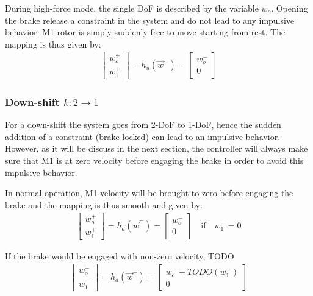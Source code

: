 During high-force mode, the single DoF is described by the variable $w_o$. Opening the brake release a constraint in the system and do not lead to any impulsive behavior. M1 rotor is simply suddenly free to move starting from rest. The mapping is thus given by:
\begin{align} 
\left[
\begin{array}{c}
w_o^+ \\ w_1^+
\end{array}
\right] = h_u( \vec{w}^- ) = 
\left[
\begin{array}{c}
w_o^- \\ 0
\end{array}
\right]
\label{eq:upshiftmap}
\end{align}



\subsubsection{Down-shift $k:2\rightarrow1$}

For a down-shift the system goes from 2-DoF to 1-DoF, hence the sudden addition of a constraint (brake locked) can lead to an impulsive behavior. However, as it will be discuss in the next section, the controller will always make sure that M1 is at zero velocity before engaging the brake in order to avoid this impulsive behavior. 


In normal operation, M1 velocity will be brought to zero before engaging the brake and the mapping is thus smooth and given by:
%
\begin{align} 
\left[
\begin{array}{c}
w_o^+ \\ w_1^+
\end{array}
\right]
 = h_d( \vec{w}^- ) = 
\left[
\begin{array}{c}
w_o^- \\ 0
\end{array}
\right] \quad \text{if} \quad w_1^-=0
\label{eq:downshiftmap_ideal}
\end{align}


%
If the brake would be engaged with non-zero velocity, TODO
\begin{align} 
\left[
\begin{array}{c}
w_o^+ \\ w_1^+
\end{array}
\right]
 = h_d( \vec{w}^- ) = 
\left[
\begin{array}{c}
w_o^- + TODO(w_1^-) \\ 0
\end{array}
\right]
\label{eq:downshiftmap_nonideal}
\end{align}



